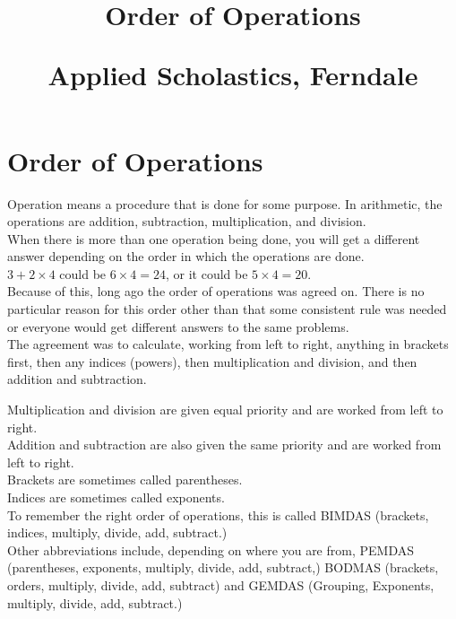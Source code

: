 \documentclass{article}
\author{}
\date{}
\title{Order of Operations\\
\vspace{28pt}
\begin{normalsize}Applied Scholastics, Ferndale \end{normalsize}}
\begin{document}
\maketitle
\pagebreak

\section*{Order of Operations}

Operation means a procedure that is done for some purpose. In arithmetic, the operations are addition, subtraction, multiplication, and division.\\

When there is more than one operation being done, you will get a different answer depending on the order in which the operations are done.\\

$3 + 2 \times 4$ could be $6 \times 4 = 24$, or it could be $5 \times 4 = 20$.\\

Because of this, long ago the order of operations was agreed on. There is no particular reason for this order other than that some consistent rule was needed or everyone would get different answers to the same problems.\\

The agreement was to calculate, working from left to right,  anything in brackets first, then any indices (powers), then multiplication and division, and then addition and subtraction.\\

\newpage

Multiplication and division are given equal priority and are worked from left to right.\\

Addition and subtraction are also given the same priority and are worked from left to right.\\

Brackets are sometimes called parentheses.\\

Indices are sometimes called exponents.\\

To remember the right order of operations, this is called BIMDAS (brackets, indices, multiply, divide, add, subtract.)\\

Other abbreviations include, depending on where you are from, PEMDAS (parentheses, exponents, multiply, divide, add, subtract,) BODMAS (brackets, orders, multiply, divide, add, subtract) and GEMDAS (Grouping, Exponents, multiply, divide, add, subtract.)
\end{document}
